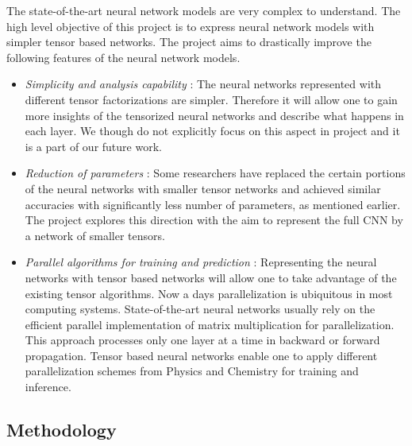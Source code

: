 The state-of-the-art neural network models are very complex to understand. The high level objective of this project is to express neural network models with simpler tensor based networks. 
The \prname project aims to drastically improve the following features of the neural network models.
\begin{itemize}
	\item \emph{Simplicity and analysis capability} : The neural networks represented with different tensor factorizations are simpler. Therefore it will allow one to gain more insights of the tensorized neural networks and describe what happens in each layer. We though do not explicitly focus on this aspect in \prname project and it is a part of our future work.
	\item \emph{Reduction of parameters} : Some researchers have replaced the certain portions of the neural networks with smaller tensor networks and achieved  similar accuracies with significantly less number of parameters, as mentioned earlier. The \prname project explores this direction with the aim to represent the full CNN by a network of smaller tensors. 
	\item \emph{Parallel algorithms for training and prediction} : Representing the neural networks with tensor based networks will allow one to take advantage of the existing tensor algorithms. Now a days parallelization is ubiquitous in most computing systems. State-of-the-art neural networks usually rely on the efficient parallel implementation of matrix multiplication for parallelization. This approach processes only one layer at a time in backward or forward propagation. Tensor based neural networks enable one to apply different parallelization schemes from Physics and Chemistry for training and inference.
\end{itemize}


\subsection*{Methodology} 


